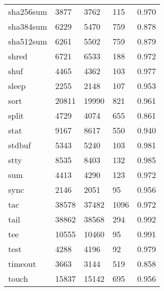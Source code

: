 \begin{longtable}{lp{4.5cm}p{4.5cm}p{4.5cm}p{4.5cm}}
sha256sum &                     3877 &         3762 &           115 &                    0.970 \\
sha384sum &                     6229 &         5470 &           759 &                    0.878 \\
sha512sum &                     6261 &         5502 &           759 &                    0.879 \\
shred     &                     6721 &         6533 &           188 &                    0.972 \\
shuf      &                     4465 &         4362 &           103 &                    0.977 \\
sleep     &                     2255 &         2148 &           107 &                    0.953 \\
sort      &                    20811 &        19990 &           821 &                    0.961 \\
split     &                     4729 &         4074 &           655 &                    0.861 \\
stat      &                     9167 &         8617 &           550 &                    0.940 \\
stdbuf    &                     5343 &         5240 &           103 &                    0.981 \\
stty      &                     8535 &         8403 &           132 &                    0.985 \\
sum       &                     4413 &         4290 &           123 &                    0.972 \\
sync      &                     2146 &         2051 &            95 &                    0.956 \\
tac       &                    38578 &        37482 &          1096 &                    0.972 \\
tail      &                    38862 &        38568 &           294 &                    0.992 \\
tee       &                    10555 &        10460 &            95 &                    0.991 \\
test      &                     4288 &         4196 &            92 &                    0.979 \\
timeout   &                     3663 &         3144 &           519 &                    0.858 \\
touch     &                    15837 &        15142 &           695 &                    0.956 \\

\end{longtable}
